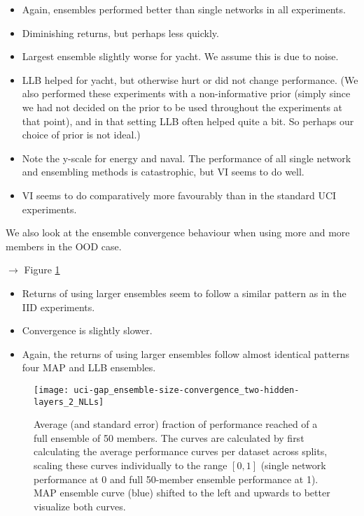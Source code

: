 \documentclass[../thesis.tex]{subfiles}
\begin{document}
\bigskip

\begin{itemize}
    \item Again, ensembles performed better than single networks in all experiments. 
    \item Diminishing returns, but perhaps less quickly.
    \item Largest ensemble slightly worse for yacht. We assume this is due to noise.
    \item LLB helped for yacht, but otherwise hurt or did not change performance. (We also performed these experiments with a non-informative prior (simply since we had not decided on the prior to be used throughout the experiments at that point), and in that setting LLB often helped quite a bit. So perhaps our choice of prior is not ideal.)
    \item Note the y-scale for energy and naval. The performance of all single network and ensembling methods is catastrophic, but VI seems to do well.
    \item VI seems to do comparatively more favourably than in the standard UCI experiments.
\end{itemize}

\bigskip
We also look at the ensemble convergence behaviour when using more and more members in the OOD case.
\bigskip

$\rightarrow$ Figure \ref{fig:uci-gap-ensemble-sizes}
\bigskip

\begin{itemize}
    \item Returns of using larger ensembles seem to follow a similar pattern as in the IID experiments.
    \item Convergence is slightly slower.
    \item Again, the returns of using larger ensembles follow almost identical patterns four MAP and LLB ensembles.
\end{itemize}


\begin{figure}
    \centering
    \texttt{[image: uci-gap\_ensemble-size-convergence\_two-hidden-layers\_2\_NLLs]} 
    \caption{Average (and standard error) fraction of performance reached of a full ensemble of 50 members. The curves are calculated by first calculating the average performance curves per dataset across splits, scaling these curves individually to the range $[0, 1]$ (single network performance at 0 and full 50-member ensemble performance at 1). MAP ensemble curve (blue) shifted to the left and upwards to better visualize both curves.}
    \label{fig:uci-gap-ensemble-sizes}
\end{figure}
\end{document}
